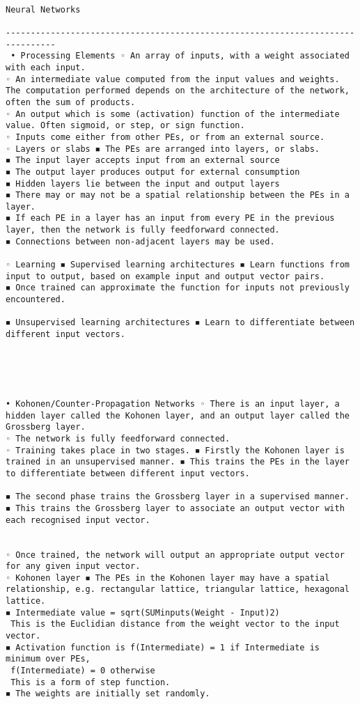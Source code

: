 \documentclass[a4paper,11pt]{report}
\begin{document}
\newpage
\begin{verbatim}

Neural Networks

--------------------------------------------------------------------------------
 • Processing Elements ◦ An array of inputs, with a weight associated with each input. 
◦ An intermediate value computed from the input values and weights. The computation performed depends on the architecture of the network, often the sum of products. 
◦ An output which is some (activation) function of the intermediate value. Often sigmoid, or step, or sign function. 
◦ Inputs come either from other PEs, or from an external source. 
◦ Layers or slabs ◾ The PEs are arranged into layers, or slabs. 
◾ The input layer accepts input from an external source 
◾ The output layer produces output for external consumption 
◾ Hidden layers lie between the input and output layers 
◾ There may or may not be a spatial relationship between the PEs in a layer. 
◾ If each PE in a layer has an input from every PE in the previous layer, then the network is fully feedforward connected. 
◾ Connections between non-adjacent layers may be used. 

◦ Learning ◾ Supervised learning architectures ◾ Learn functions from input to output, based on example input and output vector pairs. 
◾ Once trained can approximate the function for inputs not previously encountered. 

◾ Unsupervised learning architectures ◾ Learn to differentiate between different input vectors. 





• Kohonen/Counter-Propagation Networks ◦ There is an input layer, a hidden layer called the Kohonen layer, and an output layer called the Grossberg layer. 
◦ The network is fully feedforward connected. 
◦ Training takes place in two stages. ◾ Firstly the Kohonen layer is trained in an unsupervised manner. ◾ This trains the PEs in the layer to differentiate between different input vectors. 

◾ The second phase trains the Grossberg layer in a supervised manner. ◾ This trains the Grossberg layer to associate an output vector with each recognised input vector. 


◦ Once trained, the network will output an appropriate output vector for any given input vector. 
◦ Kohonen layer ◾ The PEs in the Kohonen layer may have a spatial relationship, e.g. rectangular lattice, triangular lattice, hexagonal lattice. 
◾ Intermediate value = sqrt(SUMinputs(Weight - Input)2)
 This is the Euclidian distance from the weight vector to the input vector. 
◾ Activation function is f(Intermediate) = 1 if Intermediate is minimum over PEs,
 f(Intermediate) = 0 otherwise
 This is a form of step function. 
◾ The weights are initially set randomly. 


\end{verbatim}
\end{document}
